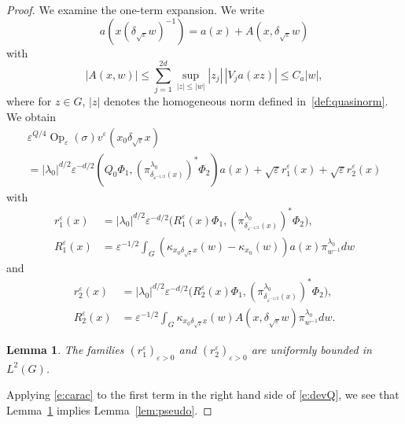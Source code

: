 \documentclass[JEP,XML,SOM,Unicode,published]{cedram}
\DeclareMathOperator{\Op}{Op}
\theoremstyle{plain}
\newtheorem{lemma}[theorem]{Lemma}
\theoremstyle{definition}
\let\eps\varepsilon
\begin{document}
\begin{proof}
We examine the one-term expansion.
We write
\begin{equation} \label{e:aA}
a(x (\delta_{\sqrt\eps} w)^{-1}) = a(x) + A(x,\delta_{\sqrt\eps} w)
\end{equation}
with
\begin{equation}\label{est:Aeps}
|A (x,w)| \leq \sum_{j=1}^{2d} \sup_{|z|\leq |w|} |z_j|\, | V_j a (xz)|\leq C_a |w|,
\end{equation}
where for $z\in G$, $|z|$ denotes the homogeneous norm defined in~\eqref{def:quasinorm}.
We obtain
\begin{multline} \label{e:devQ}
\eps^{Q/4} \Op_\eps(\sigma) v^\eps(x_0\delta_{\sqrt\eps}x)\\
=
|\lambda_0|^{d/2}\eps^{-d/2} \left(Q_0 \Phi_1,
(\pi^{\lambda_0}_{\delta_{\eps^{-1/2} }(x)})^*\Phi_2\right) a(x) +\sqrt\eps r_1^\eps(x)+\sqrt\eps r_2^\eps(x)
\end{multline}
with
\begin{align*}
r_1^\eps(x)&=
|\lambda_0|^{d/2}\eps^{-d/2} \bigl(R_1^\eps(x) \Phi_1,
(\pi^{\lambda_0}_{\delta_{\eps^{-1/2} }(x)})^*\Phi_2\bigr),\\
R_1^\eps(x)&= \eps^{-1/2} \int_{G} (\kappa_{x_0\delta_{\sqrt\eps} x}(w)-\kappa_{x_0}(w)) a(x)
\pi_{ w^{-1} }^{\lambda_0} dw
\end{align*}
and
\begin{align*}
r_2^\eps(x)&=
|\lambda_0|^{d/2}\eps^{-d/2} \bigl(R_2^\eps(x) \Phi_1,
(\pi^{\lambda_0}_{\delta_{\eps^{-1/2} }(x)})^*\Phi_2\bigr),\\
R_2^\eps(x)&= \eps^{-1/2} \int_{G} \kappa_{x_0\delta_{\sqrt\eps} x}(w)
A(x, \delta_{\sqrt\eps} w)
\pi_{ w^{-1} }^{\lambda_0} dw.
\end{align*}
\begin{lemma} \label{l:unifbounded}
The families $(r_1^\eps)_{\eps>0}$ and $(r_2^\eps)_{\eps>0}$ are uniformly bounded in $L^2(G)$.
\end{lemma}
Applying \eqref{e:carac} to the first term in the right hand side of \eqref{e:devQ}, we see that Lemma~\ref{l:unifbounded} implies Lemma~\ref{lem:pseudo}.
\end{proof}
\end{document}
